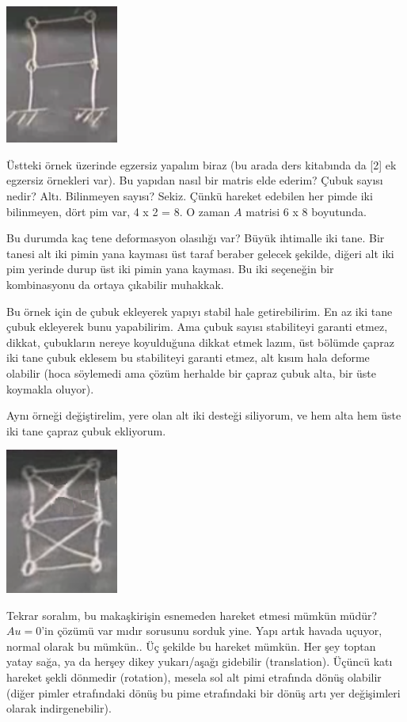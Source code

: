 \documentclass[12pt,fleqn]{article}\usepackage{../../common}
\begin{document}
\includegraphics[width=10em]{compscieng_1_15_06.png}

Üstteki örnek üzerinde egzersiz yapalım biraz (bu arada ders kitabında da [2] ek
egzersiz örnekleri var). Bu yapıdan nasıl bir matris elde ederim? Çubuk sayısı
nedir? Altı. Bilinmeyen sayısı? Sekiz. Çünkü hareket edebilen her pimde
iki bilinmeyen, dört pim var, 4 x 2 = 8. O zaman $A$ matrisi 6 x 8 boyutunda.

Bu durumda kaç tene deformasyon olasılığı var? Büyük ihtimalle iki tane.  Bir
tanesi alt iki pimin yana kayması üst taraf beraber gelecek şekilde, diğeri
alt iki pim yerinde durup üst iki pimin yana kayması. Bu iki seçeneğin bir
kombinasyonu da ortaya çıkabilir muhakkak.

Bu örnek için de çubuk ekleyerek yapıyı stabil hale getirebilirim. En az iki
tane çubuk ekleyerek bunu yapabilirim. Ama çubuk sayısı stabiliteyi garanti
etmez, dikkat, çubukların nereye koyulduğuna dikkat etmek lazım, üst bölümde
çapraz iki tane çubuk eklesem bu stabiliteyi garanti etmez, alt kısım hala
deforme olabilir (hoca söylemedi ama çözüm herhalde bir çapraz çubuk alta, bir
üste koymakla oluyor).

Aynı örneği değiştirelim, yere olan alt iki desteği siliyorum, ve hem
alta hem üste iki tane çapraz çubuk ekliyorum. 

\includegraphics[width=10em]{compscieng_1_15_07.png}

Tekrar soralım, bu makaşkirişin esnemeden hareket etmesi mümkün müdür? $Au =
0$'in çözümü var mıdır sorusunu sorduk yine. Yapı artık havada uçuyor, normal
olarak bu mümkün.. Üç şekilde bu hareket mümkün. Her şey toptan yatay sağa, ya
da herşey dikey yukarı/aşağı gidebilir (translation). Üçüncü katı hareket şekli
dönmedir (rotation), mesela sol alt pimi etrafında dönüş olabilir (diğer pimler
etrafındaki dönüş bu pime etrafındaki bir dönüş artı yer değişimleri olarak
indirgenebilir).
\end{document}
